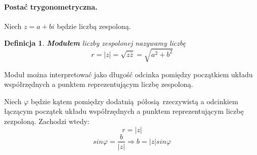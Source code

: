 \documentclass{article}
\newcommand*\conj[1]{\bar{#1}}
\newtheorem{definition}{Definicja}[section]
\begin{document}
    \paragraph{Postać trygonometryczna.} Niech $z = a+bi$ będzie liczbą zespoloną.
    \begin{definition}
        \textbf{Modułem} liczby zespolonej nazywamy liczbę
        \begin{equation*}
            r = \mathopen|z\mathclose| = \sqrt{z\conj{z}} = \sqrt{a^2+b^2}
        \end{equation*}
    \end{definition}
    Moduł można interpretować jako długość odcinka pomiędzy początkiem układu współrzędnych a punktem reprezentującym liczbę zespoloną.
    \begin{center}
    \end{center}
    Niech $\varphi$ będzie kątem pomiędzy dodatnią półosią rzeczywistą a odcinkiem łączącym początek układu współrzędnych a punktem reprezentującym liczbę zezpoloną. Zachodzi wtedy:
    \begin{equation*}
        r = \mathopen|z\mathclose|
    \end{equation*}
    \begin{equation*}
        sin \varphi = \frac{b}{\mathopen|z\mathclose|} \Longrightarrow b = \mathopen|z\mathclose| sin \varphi
    \end{equation*}
\end{document}
